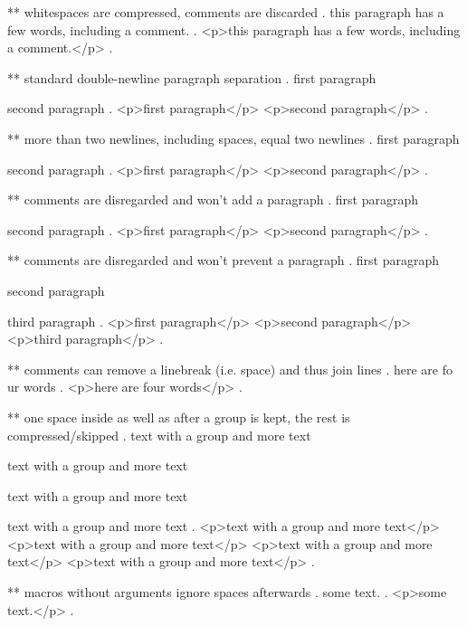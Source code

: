 ** whitespaces are compressed, comments are discarded
.
   this     paragraph  has a    few 
 words,   including
 a comment.
.
<p>this paragraph has a few words, including a comment.</p>
.


** standard double-newline paragraph separation
.
first paragraph

second paragraph
.
<p>first paragraph</p>
<p>second paragraph</p>
.



** more than two newlines, including spaces, equal two newlines
.
first paragraph

   
  


second paragraph
.
<p>first paragraph</p>
<p>second paragraph</p>
.


** comments are disregarded and won't add a paragraph
.
first paragraph




second paragraph
.
<p>first paragraph</p>
<p>second paragraph</p>
.

** comments are disregarded and won't prevent a paragraph
.
first paragraph %

second paragraph%

third paragraph
.
<p>first paragraph</p>
<p>second paragraph</p>
<p>third paragraph</p>
.


** comments can remove a linebreak (i.e. space) and thus join lines
.
here are fo%
ur words
.
<p>here are four words</p>
.


** one space inside as well as after a group is kept, the rest is compressed/skipped
.
text with {a group} and more text

text with { a group } and more text

text with { a group  } and more text

text with {  a group  }  and more text
.
<p>text with a group and more text</p>
<p>text with  a group  and more text</p>
<p>text with  a group  and more text</p>
<p>text with  a group  and more text</p>
.

** macros without arguments ignore spaces afterwards
.
some \echo  text.
.
<p>some text.</p>
.
